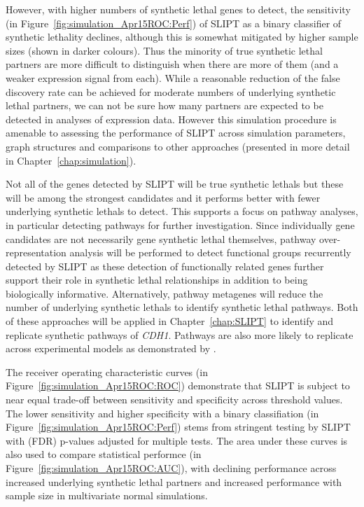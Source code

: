 However, with higher numbers of synthetic lethal genes to detect, the sensitivity (in Figure~\ref{fig:simulation_Apr15ROC:Perf}) of \gls{SLIPT} as a binary classifier of synthetic lethality declines, although this is somewhat mitigated by higher sample sizes (shown in darker colours). Thus the minority of true synthetic lethal partners are more difficult to distinguish when there are more of them (and a weaker expression signal from each). While a reasonable reduction of the false discovery rate can be achieved for moderate numbers of underlying synthetic lethal partners, we can not be sure how many partners are expected to be detected in analyses of expression data. However this simulation procedure is amenable to assessing the performance of \gls{SLIPT} across simulation parameters, graph structures and comparisons to other approaches (presented in more detail in Chapter~\ref{chap:simulation}).

Not all of the genes detected by \gls{SLIPT} will be true synthetic lethals but these will be among the strongest candidates and it performs better with fewer underlying synthetic lethals to detect. This supports a focus on pathway analyses, in particular detecting pathways for further investigation. Since individually gene candidates are not necessarily gene synthetic lethal themselves, pathway over-representation analysis will be performed to detect functional groups recurrently detected by \gls{SLIPT} as these detection of functionally related genes further support their role in synthetic lethal relationships in addition to being biologically informative. Alternatively, pathway metagenes will reduce the number of underlying synthetic lethals to identify synthetic lethal pathways. Both of these approaches will be applied in Chapter~\ref{chap:SLIPT} to identify and replicate synthetic pathways of \textit{CDH1}. Pathways are also more likely to replicate across experimental models as demonstrated by \citet{Dixon2008}.
 
The receiver operating characteristic curves (in Figure~\ref{fig:simulation_Apr15ROC:ROC}) demonstrate that \gls{SLIPT} is subject to near equal trade-off between sensitivity and specificity across threshold values. The lower sensitivity and higher specificity with a binary classifiation (in Figure~\ref{fig:simulation_Apr15ROC:Perf}) stems from stringent testing by \gls{SLIPT} with (FDR) p-values adjusted for multiple tests. The area under these curves is also used to compare statistical performce (in Figure~\ref{fig:simulation_Apr15ROC:AUC}), with declining performance across increased underlying synthetic lethal partners and increased performance with sample size in multivariate normal simulations.

